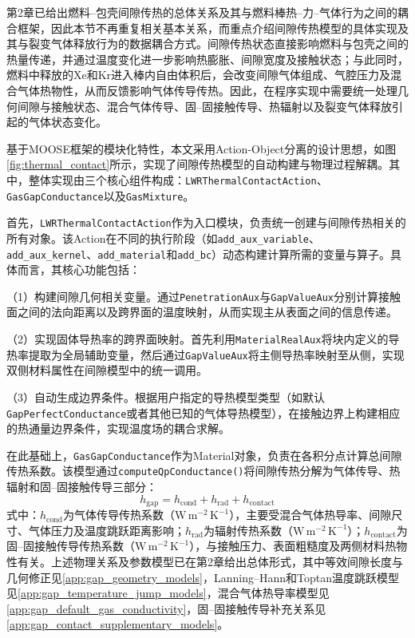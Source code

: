 
第2章已给出燃料--包壳间隙传热的总体关系及其与燃料棒热--力--气体行为之间的耦合框架，因此本节不再重复相关基本关系，而重点介绍间隙传热模型的具体实现及其与裂变气体释放行为的数据耦合方式。间隙传热状态直接影响燃料与包壳之间的热量传递，并通过温度变化进一步影响热膨胀、间隙宽度及接触状态；与此同时，燃料中释放的Xe和Kr进入棒内自由体积后，会改变间隙气体组成、气腔压力及混合气体热物性，从而反馈影响气体传导传热。因此，在程序实现中需要统一处理几何间隙与接触状态、混合气体传导、固--固接触传导、热辐射以及裂变气体释放引起的气体状态变化。

基于MOOSE框架的模块化特性，本文采用Action-Object分离的设计思想，如图\ref{fig:thermal_contact}所示，实现了间隙传热模型的自动构建与物理过程解耦。其中，整体实现由三个核心组件构成：\texttt{LWRThermalContactAction}、\texttt{GasGapConductance}以及\texttt{GasMixture}。

首先，\texttt{LWRThermalContactAction}作为入口模块，负责统一创建与间隙传热相关的所有对象。该Action在不同的执行阶段（如\texttt{add\_aux\_variable}、\texttt{add\_aux\_kernel}、\texttt{add\_material}和\texttt{add\_bc}）动态构建计算所需的变量与算子。具体而言，其核心功能包括：

（1）构建间隙几何相关变量。通过\texttt{PenetrationAux}与\texttt{GapValueAux}分别计算接触面之间的法向距离以及跨界面的温度映射，从而实现主从表面之间的信息传递。

（2）实现固体导热率的跨界面映射。首先利用\texttt{MaterialRealAux}将块内定义的导热率提取为全局辅助变量，然后通过\texttt{GapValueAux}将主侧导热率映射至从侧，实现双侧材料属性在间隙模型中的统一调用。

（3）自动生成边界条件。根据用户指定的导热模型类型（如默认\texttt{GapPerfectConductance}或者其他已知的气体导热模型），在接触边界上构建相应的热通量边界条件，实现温度场的耦合求解。

在此基础上，\texttt{GasGapConductance}作为Material对象，负责在各积分点计算总间隙传热系数。该模型通过\texttt{computeQpConductance()}将间隙传热分解为气体传导、热辐射和固--固接触传导三部分：
\begin{equation}
	h_{\text{gap}}
	=
	h_{\text{cond}}
	+
	h_{\text{rad}}
	+
	h_{\text{contact}}
\end{equation}
\noindent 式中：$h_{\text{cond}}$为气体传导传热系数（$\mathrm{W\,m^{-2}\,K^{-1}}$），主要受混合气体热导率、间隙尺寸、气体压力及温度跳跃距离影响；$h_{\text{rad}}$为辐射传热系数（$\mathrm{W\,m^{-2}\,K^{-1}}$）；$h_{\text{contact}}$为固--固接触传导传热系数（$\mathrm{W\,m^{-2}\,K^{-1}}$），与接触压力、表面粗糙度及两侧材料热物性有关。上述物理关系及参数模型已在第2章给出总体形式，其中等效间隙长度与几何修正见\ref{app:gap_geometry_models}，Lanning--Hann和Toptan温度跳跃模型见\ref{app:gap_temperature_jump_models}，混合气体热导率模型见\ref{app:gap_default_gas_conductivity}，固--固接触传导补充关系见\ref{app:gap_contact_supplementary_models}。

